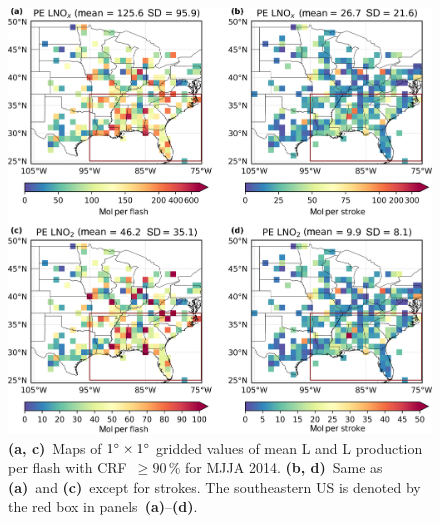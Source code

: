 \documentclass[amt]{copernicus}
\begin{document}
\begin{figure}[t]
    \includegraphics[width=13cm]{amt-2019-372-f05.png}
    \caption{\textbf{(a, c)}~Maps of $1{^{\circ}}\times 1{^{\circ}}$ gridded values of mean L
        and L production per flash with CRF~$\geq 90$\,{\%} for MJJA 2014.
        \textbf{(b, d)}~Same as \textbf{(a)}~and \textbf{(c)}~except for strokes.
        The southeastern US is denoted by the red box in panels~\textbf{(a)}--\textbf{(d)}.}
    \label{fig:PE_sum}
\end{figure}
\end{document}
